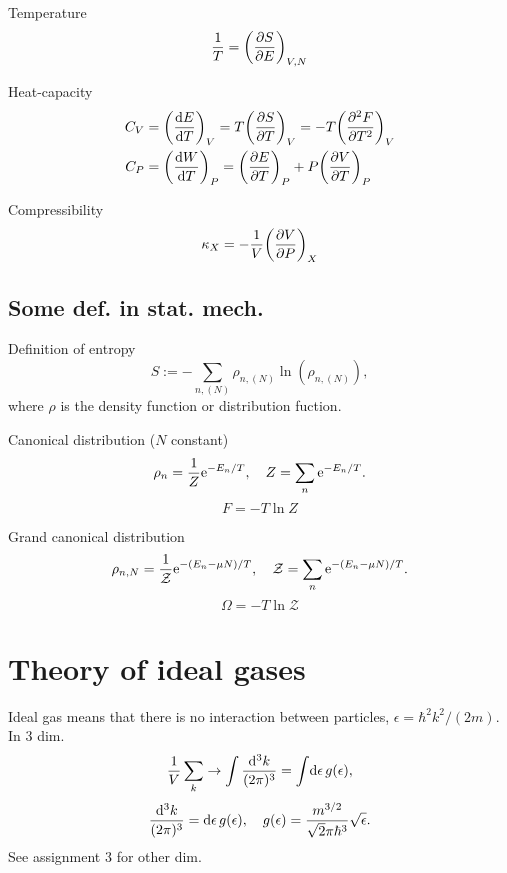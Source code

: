 \documentclass[11pt,letter, swedish, english, twocolumn
]{article}
\newcommand{\ZZ}{\ensuremath{\mathcal{Z}}}
\begin{document}
Temperature
\begin{equation}
\frac{1}{T}=\qty(\pdv{S}{E})_{V,N}
\end{equation}

Heat-capacity
\begin{equation}
\begin{aligned}
C_V&=\qty(\dv{E}{T})_V=T\qty(\pdv{S}{T})_V=-T\qty(\pdv[2]{F}{T})_V\\
C_P&=\qty(\dv{W}{T})_P=\qty(\pdv{E}{T})_P+P\qty(\pdv{V}{T})_P\\
\end{aligned}
\end{equation}

Compressibility
\begin{equation}
\kappa_X=-\frac{1}{V}\qty(\pdv{V}{P})_X
\end{equation}


\subsection{Some def. in stat. mech.}
Definition of entropy
\begin{equation}
S:=-\sum_{n,(N)} \rho_{n,(N)}\ln(\rho_{n,(N)}),
\end{equation}
where $\rho$ is the density function or distribution fuction.

Canonical distribution ($N$ constant)
\begin{equation}
\rho_n = \frac{1}{Z}\ee^{-E_n/T}\qcomma
Z=\sum_n\ee^{-E_n/T}.
\end{equation}
\begin{equation}
F=-T\ln Z
\end{equation}

Grand canonical distribution 
\begin{equation}
\rho_{n, N} = \frac{1}{\ZZ}\ee^{-(E_n-\mu N)/T}\qcomma
\ZZ=\sum_n\ee^{-(E_n-\mu N)/T}.
\end{equation}
\begin{equation}
\Omega=-T\ln \ZZ
\end{equation}



\section{Theory of ideal gases}
Ideal gas means that there is no interaction between particles,
$\epsilon=\hbar^2k^2/(2m)$. 
In 3 dim.
\begin{equation}
\frac{1}{V}\sum_k\to\int\frac{\rd^3k}{(2\pi)^3}
=\int\!\rd\epsilon\,g(\epsilon),
\end{equation}
\begin{equation}
\frac{\rd^3k}{(2\pi)^3}=\rd\epsilon\,g(\epsilon)\qcomma
g(\epsilon)=\frac{m^{3/2}}{\sqrt{2}\pi\hbar^3}\sqrt{\epsilon}.
\end{equation}
See assignment 3 for other dim.
\end{document}

